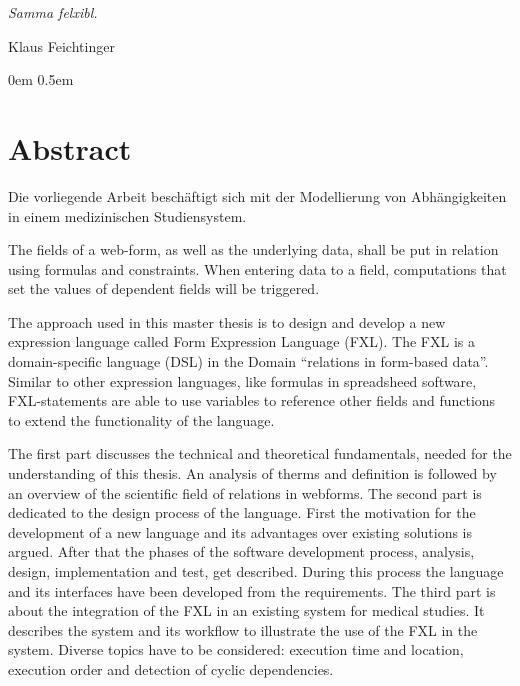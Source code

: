 \documentclass [11pt,smallheadings, a4paper]{report}
\begin{document}
\newenvironment{myquote}%
{\begin{quote}\small}%
{\end{quote}}%


\noindent
\emph{Samma felxibl.}
\begin{flushright}
Klaus Feichtinger
\end{flushright}
\pagestyle{headings}
\renewcommand{\baselinestretch}{0.9}\normalsize
\tableofcontents


\pagestyle{headings}



\parindent0em
\parskip0.5em

\sloppy 

\renewcommand{\baselinestretch}{1.0}\normalsize

\chapter*{Abstract}
Die vorliegende Arbeit beschäftigt sich mit der Modellierung von Ab\-hän\-gig\-kei\-ten in einem medizinischen Studiensystem. 

The fields of a web-form, as well as the underlying data, shall be put in relation using formulas and constraints. When entering data to a field, computations that set the values of dependent fields will be triggered.

The approach used in this master thesis is to design and develop a new expression language called Form Expression Language (FXL). The FXL is a domain-specific language (DSL) in the Domain ``relations in form-based data''. Similar to other expression languages, like formulas in spreadsheed software, FXL-statements are able to use variables to reference other fields and functions to extend the functionality of the language.

The first part discusses the technical and theoretical fundamentals, needed for the understanding of this thesis. An analysis of therms and definition is followed by an overview of the scientific field of relations in webforms. The second part is dedicated to the design process of the language. First the motivation for the development of a new language and its advantages over existing solutions is argued. After that the phases of the software development process, analysis, design, implementation and test, get described. During this process the language and its interfaces have been developed from the requirements.
The third part is about the integration of the FXL in an existing system for medical studies. It describes the system and its workflow to illustrate the use of the FXL in the system. Diverse topics have to be considered: execution time and location, execution order and detection of cyclic dependencies.
\end{document}
